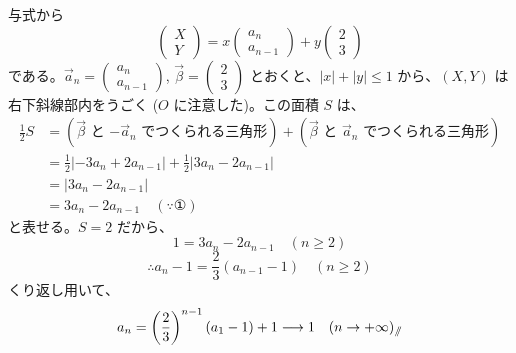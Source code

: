 \documentclass[../main.tex]{subfiles}
\begin{document}
与式から
\[
  \begin{pmatrix} X \\ Y
  \end{pmatrix} = x
  \begin{pmatrix} a_n \\ a_{n-1}
  \end{pmatrix} + y
  \begin{pmatrix} 2 \\ 3
  \end{pmatrix}
\]
である。$\vec{a}_n =
\begin{pmatrix} a_n \\ a_{n-1}
\end{pmatrix}$, $\vec{\beta} =
\begin{pmatrix} 2 \\ 3
\end{pmatrix}$ とおくと、$|x| + |y| \le 1$ から、$(X, Y)$ は右下斜線部内をうごく ($O$ に注意した)。この面積 $S$ は、
\begin{align*}
  \frac{1}{2} S &= (\text{$\vec{\beta}$ と $-\vec{a}_n$ でつくられる三角形}) + (\text{$\vec{\beta}$ と $\vec{a}_n$ でつくられる三角形}) \\
  &= \frac{1}{2} |-3a_n + 2a_{n-1}| + \frac{1}{2} |3a_n - 2a_{n-1}| \\
  &= |3a_n - 2a_{n-1}| \\
  &= 3a_n - 2a_{n-1} \quad (\because \text{①})
\end{align*}
と表せる。$S = 2$ だから、
\[
  1 = 3a_n - 2a_{n-1} \quad (n \ge 2)
\]
\[
  \therefore a_n - 1 = \frac{2}{3}(a_{n-1} - 1) \quad (n \ge 2)
\]
くり返し用いて、
\[
  a_n = \left(\frac{2}{3}\right)^{n-1} (a_1 - 1) + 1 \longrightarrow 1 \quad (n \to +\infty)_{\mathbin{/\mkern-6mu/}}
\]

\begin{center}
\end{center}
\end{document}
